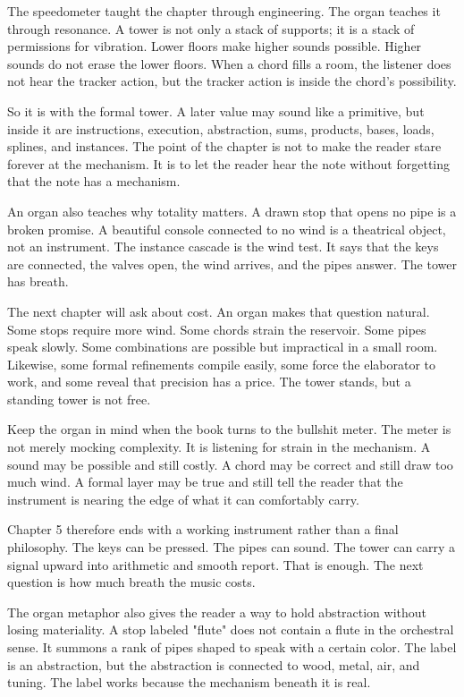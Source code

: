 The speedometer taught the chapter through engineering. The organ teaches it
through resonance. A tower is not only a stack of supports; it is a stack of
permissions for vibration. Lower floors make higher sounds possible. Higher
sounds do not erase the lower floors. When a chord fills a room, the listener
does not hear the tracker action, but the tracker action is inside the chord's
possibility.

So it is with the formal tower. A later value may sound like a primitive, but
inside it are instructions, execution, abstraction, sums, products, bases,
loads, splines, and instances. The point of the chapter is not to make the
reader stare forever at the mechanism. It is to let the reader hear the note
without forgetting that the note has a mechanism.

An organ also teaches why totality matters. A drawn stop that opens no pipe is
a broken promise. A beautiful console connected to no wind is a theatrical
object, not an instrument. The instance cascade is the wind test. It says that
the keys are connected, the valves open, the wind arrives, and the pipes
answer. The tower has breath.

The next chapter will ask about cost. An organ makes that question natural.
Some stops require more wind. Some chords strain the reservoir. Some pipes
speak slowly. Some combinations are possible but impractical in a small room.
Likewise, some formal refinements compile easily, some force the elaborator to
work, and some reveal that precision has a price. The tower stands, but a
standing tower is not free.

Keep the organ in mind when the book turns to the bullshit meter. The meter is
not merely mocking complexity. It is listening for strain in the mechanism. A
sound may be possible and still costly. A chord may be correct and still draw
too much wind. A formal layer may be true and still tell the reader that the
instrument is nearing the edge of what it can comfortably carry.

Chapter 5 therefore ends with a working instrument rather than a final
philosophy. The keys can be pressed. The pipes can sound. The tower can carry a
signal upward into arithmetic and smooth report. That is enough. The next
question is how much breath the music costs.

The organ metaphor also gives the reader a way to hold abstraction without
losing materiality. A stop labeled "flute" does not contain a flute in the
orchestral sense. It summons a rank of pipes shaped to speak with a certain
color. The label is an abstraction, but the abstraction is connected to wood,
metal, air, and tuning. The label works because the mechanism beneath it is
real.

